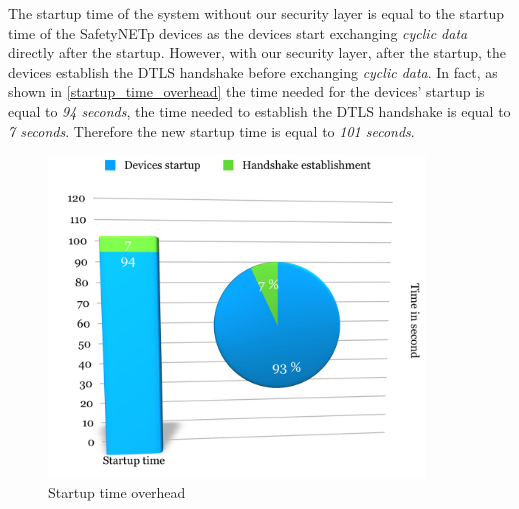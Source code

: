 The startup time of the system without our security layer is equal to the startup time of the SafetyNETp devices
as the devices start exchanging \textit{cyclic data} directly after the startup. However, with our security layer, after the startup,
the devices establish the DTLS handshake before exchanging \textit{cyclic data}. In fact, as shown in \autoref{startup_time_overhead}
the time needed for the devices' startup is equal to \textit{94 seconds}, the time needed to establish the DTLS handshake is equal to
\textit{7 seconds}. Therefore the new startup time is equal to \textit{101 seconds}.


\begin{figure}[H]
\centering
\includegraphics[width=10cm,frame]{figures/realization/startup_time_overhead.jpg}
\caption{Startup time overhead}\label{startup_time_overhead}
\end{figure}


